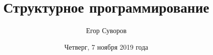 \documentclass[utf8,xcolor=table]{beamer}
\title{Структурное программирование}
\author{Егор Суворов}
\institute[НИУ ВШЭ]{Курс <<Основы программирования>>}
\date[07.11.2019]{Четверг, 7 ноября 2019 года}
\begin{document}
\begin{frame}
\titlepage
\end{frame}







\end{document}
